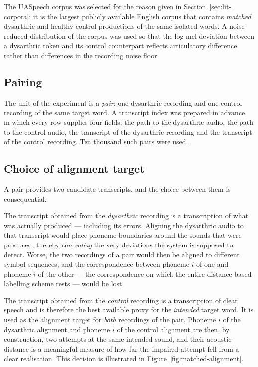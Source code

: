 The UASpeech corpus \cite{kim2008dysarthric} was selected for the reason given
in Section~\ref{sec:lit-corpora}: it is the largest publicly available English
corpus that contains \emph{matched} dysarthric and healthy-control productions
of the same isolated words. A noise-reduced distribution of the corpus was used
so that the log-mel deviation between a dysarthric token and its control
counterpart reflects articulatory difference rather than differences in the
recording noise floor.

\subsection{Pairing}

The unit of the experiment is a \emph{pair}: one dysarthric recording and one
control recording of the same target word. A transcript index was prepared in
advance, in which every row supplies four fields: the path to the dysarthric
audio, the path to the control audio, the transcript of the dysarthric
recording and the transcript of the control recording. Ten thousand such pairs
were used.

\subsection{Choice of alignment target}

A pair provides two candidate transcripts, and the choice between them is
consequential.

The transcript obtained from the \emph{dysarthric} recording is a transcription
of what was actually produced --- including its errors. Aligning the dysarthric
audio to that transcript would place phoneme boundaries around the sounds that
were produced, thereby \emph{concealing} the very deviations the system is
supposed to detect. Worse, the two recordings of a pair would then be aligned
to different symbol sequences, and the correspondence between phoneme $i$ of one
and phoneme $i$ of the other --- the correspondence on which the entire
distance-based labelling scheme rests --- would be lost.

The transcript obtained from the \emph{control} recording is a transcription of
clear speech and is therefore the best available proxy for the \emph{intended}
target word. It is used as the alignment target for \emph{both} recordings of
the pair. Phoneme $i$ of the dysarthric alignment and phoneme $i$ of the control
alignment are then, by construction, two attempts at the same intended sound,
and their acoustic distance is a meaningful measure of how far the impaired
attempt fell from a clear realisation. This decision is illustrated in
Figure~\ref{fig:matched-alignment}.

